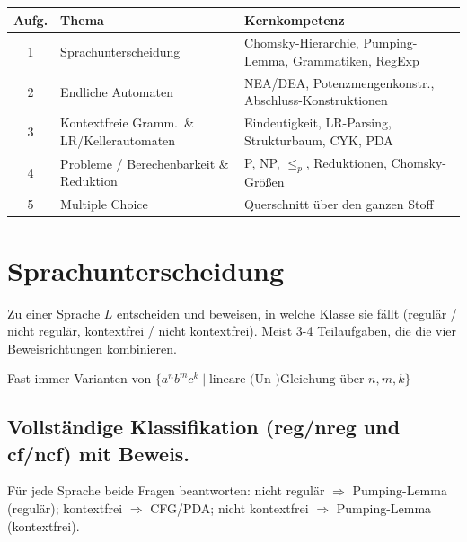 

\begin{mytable}
    \begin{tabular}{@{}c l l@{}}
        \hline
        \textbf{Aufg.} & \textbf{Thema} & \textbf{Kernkompetenz}\\
        \hline
        1 & Sprachunterscheidung & Chomsky-Hierarchie, Pumping-Lemma, Grammatiken, RegExp\\
        2 & Endliche Automaten & NEA/DEA, Potenzmengenkonstr., Abschluss-Konstruktionen\\
        3 & Kontextfreie Gramm.\ \& LR/Kellerautomaten & Eindeutigkeit, LR-Parsing, Strukturbaum, CYK, PDA\\
        4 & Probleme / Berechenbarkeit \& Reduktion & P, NP, $\le_p$, Reduktionen, Chomsky-Größen\\
        5 & Multiple Choice & Querschnitt über den ganzen Stoff\\
        \hline
    \end{tabular}
\end{mytable}

\section{Sprachunterscheidung}\label{subsec:sprachunterscheidung}
Zu einer Sprache $L$ entscheiden und beweisen, in welche Klasse sie fällt
(regulär / nicht regulär, kontextfrei / nicht kontextfrei).
Meist 3-4 Teilaufgaben, die die vier Beweisrichtungen kombinieren.
\begin{bem}
    Fast immer Varianten von $\{a^n b^m c^k \mid \text{lineare (Un-)Gleichung über } n,m,k\}$
\end{bem}

\subsection{Vollständige Klassifikation (reg/nreg und cf/ncf) mit Beweis.}

Für jede Sprache beide Fragen beantworten:
nicht regulär $\Rightarrow$ Pumping-Lemma (regulär); kontextfrei $\Rightarrow$ CFG/PDA;
nicht kontextfrei $\Rightarrow$ Pumping-Lemma (kontextfrei).

